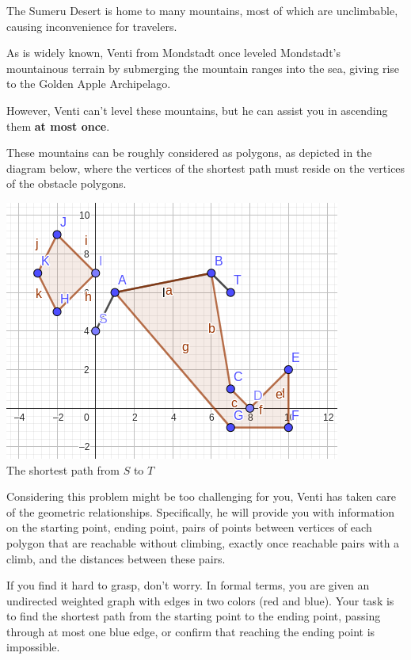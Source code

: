 The Sumeru Desert is home to many mountains, most of which are unclimbable, causing inconvenience for travelers.

As is widely known, Venti from Mondstadt once leveled Mondstadt's mountainous terrain by submerging the mountain ranges into the sea, giving rise to the Golden Apple Archipelago.

However, Venti can't level these mountains, but he can assist you in ascending them \textbf{at most once}.

These mountains can be roughly considered as polygons, as depicted in the diagram below, where the vertices of the shortest path must reside on the vertices of the obstacle polygons.

\begin{center}
    \includegraphics[scale=0.8]{example.png} \\
    \small{The shortest path from $S$ to $T$}
\end{center}

Considering this problem might be too challenging for you, Venti has taken care of the geometric relationships. Specifically, he will provide you with information on the starting point, ending point, pairs of points between vertices of each polygon that are reachable without climbing, exactly once reachable pairs with a climb, and the distances between these pairs.

If you find it hard to grasp, don't worry. In formal terms, you are given an undirected weighted graph with edges in two colors (red and blue). Your task is to find the shortest path from the starting point to the ending point, passing through at most one blue edge, or confirm that reaching the ending point is impossible.


